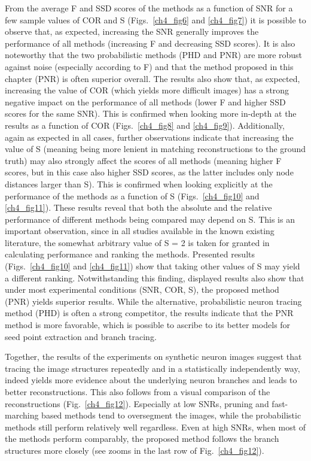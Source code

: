 From the average F and SSD scores of the methods as a function of SNR for a few sample values of COR and S (Figs.~\ref{ch4_fig6} and \ref{ch4_fig7}) it is possible to observe that, as expected, increasing the SNR generally improves the performance of all methods (increasing F and decreasing SSD scores). It is also noteworthy that the two probabilistic methods (PHD and PNR) are more robust against noise (especially according to F) and that the method proposed in this chapter (PNR) is often superior overall. The results also show that, as expected, increasing the value of COR (which yields more difficult images) has a strong negative impact on the performance of all methods (lower F and higher SSD scores for the same SNR). This is confirmed when looking more in-depth at the results as a function of COR (Figs.~\ref{ch4_fig8} and \ref{ch4_fig9}). Additionally, again as expected in all cases, further observations indicate that increasing the value of S (meaning being more lenient in matching reconstructions to the ground truth) may also strongly affect the scores of all methods (meaning higher F scores, but in this case also higher SSD scores, as the latter includes only node distances larger than S). This is confirmed when looking explicitly at the performance of the methods as a function of S (Figs.~\ref{ch4_fig10} and \ref{ch4_fig11}). These results reveal that both the absolute and the relative performance of different methods being compared may depend on S. This is an important observation, since in all studies available in the known existing literature, the somewhat arbitrary value of S = 2 is taken for granted in calculating performance and ranking the methods. Presented results (Figs.~\ref{ch4_fig10} and \ref{ch4_fig11}) show that taking other values of S may yield a different ranking. Notwithstanding this finding, displayed results also show that under most experimental conditions (SNR, COR, S), the proposed method (PNR) yields superior results. While the alternative, probabilistic neuron tracing method (PHD) \cite{radojevic2017automated} is often a strong competitor, the results indicate that the PNR method is more favorable, which is possible to ascribe to its better models for seed point extraction and branch tracing.

Together, the results of the experiments on synthetic neuron images suggest that tracing the image structures repeatedly and in a statistically independently way, indeed yields more evidence about the underlying neuron branches and leads to better reconstructions. This also follows from a visual comparison of the reconstructions (Fig.~\ref{ch4_fig12}). Especially at low SNRs, pruning and fast-marching based methods tend to oversegment the images, while the probabilistic methods still perform relatively well regardless. Even at high SNRs, when most of the methods perform comparably, the proposed method follows the branch structures more closely (see zooms in the last row of Fig.~\ref{ch4_fig12}).
